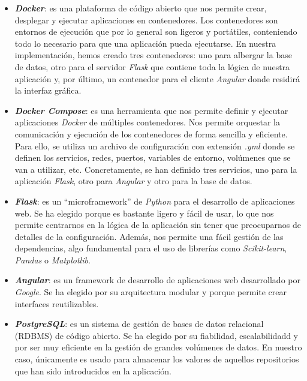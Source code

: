 \begin{itemize}
    \item \textbf{\textit{Docker}}: es una plataforma de código abierto que nos permite crear, desplegar
    y ejecutar aplicaciones en contenedores. Los contenedores son entornos de ejecución que por
    lo general son ligeros y portátiles, conteniendo todo lo necesario para que una aplicación
    pueda ejecutarse. En nuestra implementación, hemos creado tres contenedores: uno para albergar
    la base de datos, otro para el servidor \textit{Flask} que contiene toda la lógica de nuestra
    aplicación y, por último, un contenedor para el cliente \textit{Angular} donde residirá la
    interfaz gráfica.\\

    \item \textbf{\textit{Docker Compose}}: es una herramienta que nos permite definir y ejecutar
    aplicaciones \textit{Docker} de múltiples contenedores. Nos permite orquestar la comunicación
    y ejecución de los contenedores de forma sencilla y eficiente. Para ello, se utiliza un archivo
    de configuración con extensión \textit{.yml} donde se definen los servicios, redes, puertos,
    variables de entorno, volúmenes que se van a utilizar, etc. Concretamente, se han definido
    tres servicios, uno para la aplicación \textit{Flask}, otro para \textit{Angular} y otro para
    la base de datos.\\

    \item \textbf{\textit{Flask}}: es un ``microframework'' de \textit{Python} para el desarrollo
    de aplicaciones web. Se ha elegido porque es bastante ligero y fácil de usar, lo que nos
    permite centrarnos en la lógica de la aplicación sin tener que preocuparnos de detalles de la
    configuración. Además, nos permite una fácil gestión de las dependencias, algo fundamental
    para el uso de librerías como \textit{Scikit-learn}, \textit{Pandas} o \textit{Matplotlib}.\\

    \item \textbf{\textit{Angular}}: es un framework de desarrollo de aplicaciones web desarrollado
    por \textit{Google}. Se ha elegido por su arquitectura modular y porque permite crear
    interfaces reutilizables.\\

    \item \textbf{\textit{PostgreSQL}}: es un sistema de gestión de bases de datos relacional
    (RDBMS) de código abierto. Se ha elegido por su fiabilidad, escalabilidadd y por ser muy
    eficiente en la gestión de grandes volúmenes de datos. En nuestro caso, únicamente es
    usado para almacenar los valores de aquellos repositorios que han sido introducidos en la
    aplicación.\\
\end{itemize}



